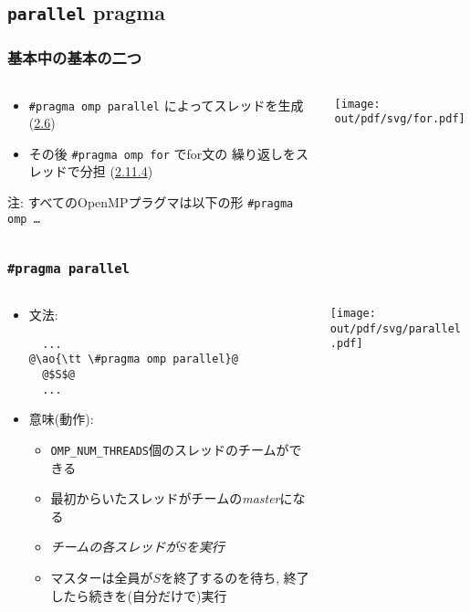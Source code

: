 \documentclass[10pt,dvipdfmx]{beamer}
\newcommand{\sectionompparallel}{\href{https://www.openmp.org/spec-html/5.1/openmpse14.html\#x59-590002.6}{2.6}}
\newcommand{\sectionompfor}{\href{https://www.openmp.org/spec-html/5.1/openmpsu48.html}{2.11.4}}
\newcommand{\ao}[1]{{\color{blue}#1}}
\newcommand{\aka}[1]{{\color{red}#1}}
\begin{document}
\subsection{{\tt parallel} pragma}

\begin{frame}
\frametitle{基本中の基本の二つ}
\begin{columns}
\begin{column}{0.5\textwidth}
\begin{itemize}

\item \ao{\tt \#pragma omp parallel}
  によってスレッドを生成 (\sectionompparallel)
\item その後 \ao{\tt \#pragma omp for} でfor文の
  繰り返しをスレッドで分担 (\sectionompfor)
\end{itemize}
注: すべてのOpenMPプラグマは以下の形
{\tt \#pragma omp \ldots}
\end{column}
\begin{column}{0.5\textwidth}
\texttt{[image: out/pdf/svg/for.pdf]}
\end{column}
\end{columns}
\end{frame}

\begin{frame}[fragile]
\frametitle{{\tt \#pragma parallel}}
\begin{columns}
  \begin{column}{0.6\textwidth}
\begin{itemize}
\item 文法:
\begin{lstlisting}
  ...
@\ao{\tt \#pragma omp parallel}@
  @$S$@
  ...
\end{lstlisting}
\item 意味(動作): 
  \begin{itemize}
  \item {\tt OMP\_NUM\_THREADS}個の\ao{スレッド}のチームができる
  \item 最初からいたスレッドがチームの{\em master}になる
  \item \aka{\em チームの各スレッドが$S$を実行}
  \item マスターは全員が$S$を終了するのを待ち, 終了したら続きを(自分だけで)実行
  \end{itemize}
\end{itemize}
  \end{column}

  \begin{column}{0.4\textwidth}
\texttt{[image: out/pdf/svg/parallel.pdf]}
  \end{column}
\end{columns}
\end{frame}
\end{document}
